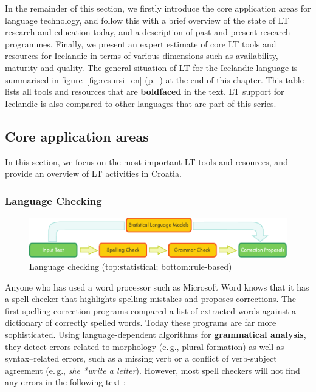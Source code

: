 \begin{multicols}{2}
In the remainder of this section, we firstly introduce the core application areas for language technology, and follow this with a brief overview of the state of LT research and education today, and a description of past and present research programmes. Finally, we present an expert estimate of core LT tools and resources for Icelandic in terms of various dimensions such as availability, maturity and quality. The general situation of LT for the Icelandic language is summarised in figure~\ref{fig:resursi_en} (p.~\pageref{fig:resursi_en}) at the end of this chapter. This table lists all tools and resources that are \textbf{boldfaced} in the text. LT support for Icelandic is also compared to other languages that are part of this series.

\subsection{Core application areas}

In this section, we focus on the most important LT tools and resources, and provide an overview of LT activities in Croatia.

\subsubsection{Language Checking}

\begin{figure}[t]
  \center
  \includegraphics[width=\textwidth]{../_media/english/language_checking}
  \caption{Language checking (top:statistical; bottom:rule-based)}
  \label{fig:langcheckingaarch_en}
\end{figure}

Anyone who has used a word processor such as Microsoft Word knows that it has a spell checker that highlights spelling mistakes and proposes corrections. The first spelling correction programs compared a list of extracted words against a dictionary of correctly spelled words. Today these programs are far more sophisticated. Using language-dependent algorithms for \textbf{grammatical analysis}, they detect errors related to morphology (e.\,g., plural formation) as well as syntax--related errors, such as a missing verb or a conflict of verb-subject agreement (e.\,g., \textit{she *write a letter}). However, most spell checkers will not find any errors in the following text \cite{art11}:


\end{multicols}
